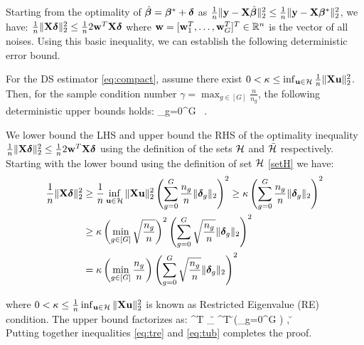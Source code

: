 Starting from the optimality of $\hat{\boldsymbol{\beta}} = \boldsymbol{\beta} ^* + \boldsymbol{\delta}$ as $\frac{1}{n}\|\mathbf{y} - \mathbf{X} \hat{\boldsymbol{\beta}}\|_{2}^2 \leq \frac{1}{n} \|\mathbf{y} - \mathbf{X} \boldsymbol{\beta} ^*\|_{2}^2$, we have: $\frac{1}{n}\|\mathbf{X} \boldsymbol{\delta}\|_{2}^2 \leq \frac{1}{n}2\mathbf{w}^T \mathbf{X}\boldsymbol{\delta}$ where $\mathbf{w} = [\mathbf{w}_1^T, \dots, \mathbf{w}_G^T]^T \in \mathbb R^n$ is the vector of all noises.
Using this basic inequality, we can establish the following deterministic error bound.
\begin{theorem}
	\label{theo:deter}
	For the DS estimator \eqref{eq:compact}, assume there exist $0 < \kappa \leq \inf_{\u \in \cH} \frac{1}{n} \norm{\X \u}{2}^2$. Then, for the sample condition number $\gamma = \max_{g \in [G]} \frac{n}{n_g}$, the following deterministic upper bounds holds:
	\be
	\nr
	\sum_{g=0}^{G}   \leq {}~. %
	\ee
\end{theorem}
\begin{IEEEproof}
	We lower bound the LHS and upper bound the RHS of the optimality inequality $\frac{1}{n}\|\mathbf{X} \boldsymbol{\delta}\|_{2}^2 \leq \frac{1}{n}2\mathbf{w}^T \mathbf{X}\boldsymbol{\delta}$ using the definition of the sets $\cH$ and $\bcH$ respectively. 
	Starting with the lower bound using the definition of set $\cH$ \eqref{setH} we have:
	{\small
	\begin{align}
		\nr 
		\frac{1}{n}\norm{\X \ddelta}{2}^2 &\geq \frac{1}{n} \inf_{\u \in \cH} \norm{\X \u}{2}^2  \left(\sum_{g=0}^{G} {\frac{n_g}{n}} \norm{\ddelta_g}{2} \right)^2 
		\geq \kappa  \left(\sum_{g=0}^{G} {\frac{n_g}{n}} \norm{\ddelta_g}{2} \right)^2  
		\\  \label{eq:tre}  
		&\geq \kappa  \left(\min_{g \in [G] } \sqrt{\frac{n_g}{n}}\right)^2 \left(\sum_{g=0}^{G} \sqrt{\frac{n_g}{n}} \norm{\ddelta_g}{2} \right)^2 
		\\ \nr 
		&= \kappa  \left(\min_{g \in [G] } \frac{n_g}{n}\right) \left(\sum_{g=0}^{G} \sqrt{\frac{n_g}{n}} \norm{\ddelta_g}{2} \right)^2  		 		
	\end{align}
	}

	where $0 < \kappa \leq \frac{1}{n}  \inf_{\u \in \cH} \norm{\X \u}{2}^2 $ is known as Restricted Eigenvalue (RE) condition. 
	The upper bound factorizes as:
	\beq 
	\label{eq:tub}
	\w^T \X\ddelta \leq {} \sup_{\u \in \bcH} \w^T \X \u \left(\sum_{g=0}^{G}   \right) , \u \in \cH \\ 
	\eeq
	Putting together inequalities \eqref{eq:tre} and \eqref{eq:tub} completes the proof. 
\end{IEEEproof}

